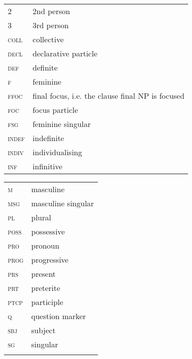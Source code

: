 \documentclass[output=paper]{langsci/langscibook}
\begin{document}
\begin{tabularx}{.45\textwidth}{lX}
2 & 2nd person \\
3 & 3rd person \\
\textsc{coll} & collective \\
\textsc{decl} & declarative particle \\
\textsc{def} & definite \\
\textsc{f} & feminine \\
\textsc{ffoc} & final focus, i.e. the clause final NP is focused \\
\textsc{foc} & focus particle \\
\textsc{fsg} & feminine singular \\
\textsc{indef} & indefinite \\
\textsc{indiv} & individualising \\
\textsc{inf} & infinitive \\
\end{tabularx}
\begin{tabularx}{.45\textwidth}{lX} 
\textsc{m} & masculine \\
\textsc{msg} & masculine singular \\
\textsc{pl} & plural \\
\textsc{poss} & possessive \\
\textsc{pro} & pronoun \\
\textsc{prog} & progressive \\
\textsc{prs} & present \\
\textsc{prt} & preterite \\
\textsc{ptcp} & participle \\
\textsc{q} & question marker \\
\textsc{sbj} & subject \\
\textsc{sg} & singular \\
\\
\end{tabularx}



 
 

\printbibliography[heading=subbibliography,notkeyword=this]
\end{document}
